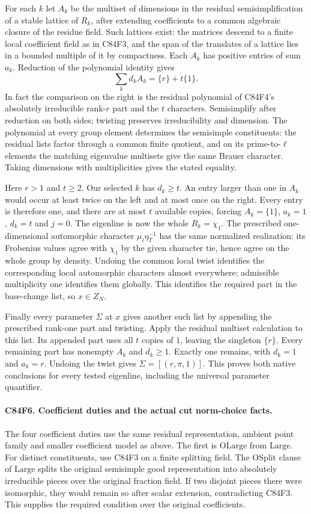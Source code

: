 For each $k$ let $A_k$ be the multiset of dimensions in the
residual semisimplification of a stable lattice of $R_k$, after
extending coefficients to a common algebraic closure of the
residue field. Such lattices exist: the matrices descend to a
finite local coefficient field as in C84F3, and the span of the
translates of a lattice lies in a bounded multiple of it by
compactness. Each $A_k$ has positive entries of sum $a_k$.
Reduction of the polynomial identity gives
\[
            \sum_k d_k A_k=\{r\}+t\{1\}.
\]
In fact the comparison on the right is the residual polynomial
of C84F4's absolutely irreducible rank-$r$ part and the $t$
characters. Semisimplify after reduction on both sides; twisting
preserves irreducibility and dimension. The polynomial at every
group element determines the semisimple constituents: the
residual lists factor through a common finite quotient, and on
its prime-to-$\ell$ elements the matching eigenvalue multisets
give the same Brauer character. Taking dimensions with
multiplicities gives the stated equality.

Here $r>1$ and $t\ge2$. Our selected $k$ has $d_k\ge t$.
An entry larger than one in $A_k$ would occur at least twice
on the left and at most once on the right. Every entry is
therefore one, and there are at most $t$ available copies,
forcing $A_k=\{1\}$, $a_k=1$, $d_k=t$ and $j=0$.
The eigenline is now the whole $R_k=\chi_1$. The prescribed
one-dimensional automorphic character $\mu_i\eta_T^{-1}$
has the same normalized realization: its Frobenius values
agree with $\chi_1$ by the given character tie, hence agree
on the whole group by density. Undoing the common local twist
identifies the corresponding local automorphic characters almost
everywhere; admissible multiplicity one identifies them globally.
This identifies the required part in the base-change list, so
$x\in Z_N$.

Finally every parameter $\Sigma$ at $x$ gives another such list
by appending the prescribed rank-one part and twisting. Apply
the residual multiset calculation to this list. Its appended
part uses all $t$ copies of $1$, leaving the singleton $\{r\}$.
Every remaining part has nonempty $A_k$ and $d_k\ge1$. Exactly
one remains, with $d_k=1$ and $a_k=r$. Undoing the twist gives
$\Sigma=[(r,\pi,1)]$. This proves both native conclusions for
every tested eigenline, including the universal parameter
quantifier.

\paragraph{C84F6. Coefficient duties and the actual cut norm-choice facts.}
The four coefficient duties use the same residual representation,
ambient point family and smaller coefficient model as above.
The first is $\mathrm{OLarge}$ from $\mathrm{Large}$. For distinct
constituents, use C84F3 on a finite splitting field. The
$\mathrm{OSplit}$ clause of $\mathrm{Large}$ splits the original
semisimple good representation into absolutely irreducible pieces
over the original fraction field. If two disjoint pieces there
were isomorphic, they would remain so after scalar extension,
contradicting C84F3. This supplies the required condition over
the original coefficients.

